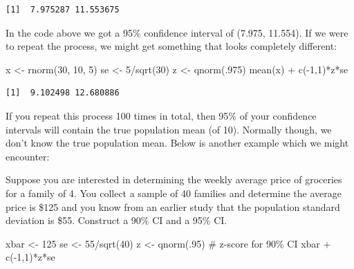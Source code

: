 \documentclass[
  letterpaper,
  DIV=11,
  numbers=noendperiod]{scrreprt}
\newenvironment{Shaded}{\begin{snugshade}}{\end{snugshade}}
\newcommand{\CommentTok}[1]{\textcolor[rgb]{0.37,0.37,0.37}{#1}}
\newcommand{\DecValTok}[1]{\textcolor[rgb]{0.68,0.00,0.00}{#1}}
\newcommand{\FunctionTok}[1]{\textcolor[rgb]{0.28,0.35,0.67}{#1}}
\newcommand{\NormalTok}[1]{\textcolor[rgb]{0.00,0.23,0.31}{#1}}
\newcommand{\OtherTok}[1]{\textcolor[rgb]{0.00,0.23,0.31}{#1}}
\newcommand{\SpecialCharTok}[1]{\textcolor[rgb]{0.37,0.37,0.37}{#1}}
\begin{document}
\begin{verbatim}
[1]  7.975287 11.553675
\end{verbatim}

In the code above we got a 95\% confidence interval of (7.975, 11.554).
If we were to repeat the process, we might get something that looks
completely different:

\begin{Shaded}
\begin{Highlighting}[]
\NormalTok{x }\OtherTok{\textless{}{-}} \FunctionTok{rnorm}\NormalTok{(}\DecValTok{30}\NormalTok{, }\DecValTok{10}\NormalTok{, }\DecValTok{5}\NormalTok{)}
\NormalTok{se }\OtherTok{\textless{}{-}} \DecValTok{5}\SpecialCharTok{/}\FunctionTok{sqrt}\NormalTok{(}\DecValTok{30}\NormalTok{)}
\NormalTok{z }\OtherTok{\textless{}{-}} \FunctionTok{qnorm}\NormalTok{(.}\DecValTok{975}\NormalTok{)}
\FunctionTok{mean}\NormalTok{(x) }\SpecialCharTok{+} \FunctionTok{c}\NormalTok{(}\SpecialCharTok{{-}}\DecValTok{1}\NormalTok{,}\DecValTok{1}\NormalTok{)}\SpecialCharTok{*}\NormalTok{z}\SpecialCharTok{*}\NormalTok{se}
\end{Highlighting}
\end{Shaded}

\begin{verbatim}
[1]  9.102498 12.680886
\end{verbatim}

If you repeat this process 100 times in total, then 95\% of your
confidence intervals will contain the true population mean (of 10).
Normally though, we don't know the true population mean. Below is
another example which we might encounter:

Suppose you are interested in determining the weekly average price of
groceries for a family of 4. You collect a sample of 40 families and
determine the average price is \$125 and you know from an earlier study
that the population standard deviation is \$55. Construct a 90\% CI and
a 95\% CI.

\begin{Shaded}
\begin{Highlighting}[]
\NormalTok{xbar }\OtherTok{\textless{}{-}} \DecValTok{125}
\NormalTok{se }\OtherTok{\textless{}{-}} \DecValTok{55}\SpecialCharTok{/}\FunctionTok{sqrt}\NormalTok{(}\DecValTok{40}\NormalTok{)}
\NormalTok{z }\OtherTok{\textless{}{-}} \FunctionTok{qnorm}\NormalTok{(.}\DecValTok{95}\NormalTok{) }\CommentTok{\# z{-}score for 90\% CI}
\NormalTok{xbar }\SpecialCharTok{+} \FunctionTok{c}\NormalTok{(}\SpecialCharTok{{-}}\DecValTok{1}\NormalTok{,}\DecValTok{1}\NormalTok{)}\SpecialCharTok{*}\NormalTok{z}\SpecialCharTok{*}\NormalTok{se}
\end{Highlighting}
\end{Shaded}
\end{document}
